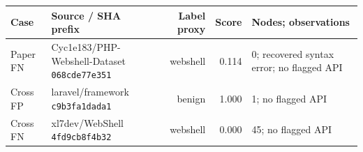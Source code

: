 \begin{tabular}{@{}llrrl@{}}
\toprule
Case & Source / SHA prefix & Label proxy & Score & Nodes; observations \\ \midrule
Paper FN & \makecell[l]{Cyc1e183/PHP-Webshell-Dataset\\\texttt{068cde77e351}} & webshell & 0.114 & 0; recovered syntax error; no flagged API \\
Cross FP & \makecell[l]{laravel/framework\\\texttt{c9b3fa1dada1}} & benign & 1.000 & 1; no flagged API \\
Cross FN & \makecell[l]{xl7dev/WebShell\\\texttt{4fd9cb8f4b32}} & webshell & 0.000 & 45; no flagged API \\
\bottomrule
\end{tabular}

